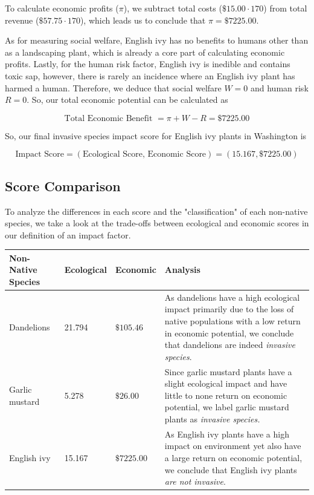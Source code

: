 To calculate economic profits (\(\pi\)), we subtract total costs (\(\$15.00 \cdot 170\)) from total revenue (\(\$57.75 \cdot 170\)), which leads us to conclude that \(\pi = \$7225.00\).

As for measuring social welfare, English ivy has no benefits to humans other than as a landscaping plant, which is already a core part of calculating economic profits. Lastly, for the human risk factor, English ivy is inedible and contains toxic sap, however, there is rarely an incidence where an English ivy plant has harmed a human. Therefore, we deduce that social welfare \(W = 0\) and human risk \(R = 0\). So, our total economic potential can be calculated as 

\[\text{Total Economic Benefit } = \pi + W - R = \$7225.00\]

So, our final invasive species impact score for English ivy plants in Washington is

\[\text{Impact Score} = (\text{Ecological Score, Economic Score}) = (15.167, \$7225.00)\]

\subsection{Score Comparison}

To analyze the differences in each score and the "classification" of each non-native species, we take a look at the trade-offs between ecological and economic scores in our definition of an impact factor.

\begin{table}[h]
\renewcommand{\arraystretch}{1.3}
    \begin{tabularx}{\textwidth}{p{}llX}
    \toprule
    \textbf{Non-Native Species}  & \textbf{Ecological} & \textbf{Economic} & \textbf{Analysis} \\ \midrule
    \raggedright Dandelions & 21.794 & \(\$105.46\) & As dandelions have a high ecological impact primarily due to the loss of native populations with a low return in economic potential, we conclude that dandelions are indeed \textit{invasive species}. \\
    \rowcolor{gray!15}
    \raggedright Garlic mustard & 5.278  & \(\$26.00\) & Since garlic mustard plants have a slight ecological impact and have little to none return on economic potential, we label garlic mustard plants as \textit{invasive species.}\\
    \raggedright English ivy & 15.167 & \(\$7225.00\) & As English ivy plants have a high impact on environment yet also have a large return on economic potential, we conclude that English ivy plants \textit{are not invasive}.\\
    \bottomrule
    \end{tabularx}
\end{table}